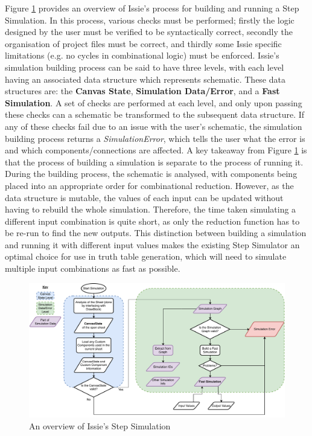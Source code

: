 Figure \ref{fig:flowchartSim} provides an overview of Issie's process for building and running a Step Simulation. In this process, various checks must be performed; firstly the logic designed by the user must be verified to be syntactically correct, secondly the organisation of project files must be correct, and thirdly some Issie specific limitations (e.g. no cycles in combinational logic) must be enforced. Issie's simulation building process can be said to have three levels, with each level having an associated data structure which represents schematic. These data structures are: the \textbf{Canvas State}, \textbf{Simulation Data/Error}, and a \textbf{Fast Simulation}. A set of checks are performed at each level, and only upon passing these checks can a schematic be transformed to the subsequent data structure.
If any of these checks fail due to an issue with the user's schematic, the simulation building process returns a \textit{SimulationError}, which tells the user what the error is and which components/connections are affected. A key takeaway from Figure \ref{fig:flowchartSim} is that the process of building a simulation is separate to the process of running it. During the  building process, the schematic is analysed, with components being placed into an appropriate order for combinational reduction. However, as the  data structure is mutable, the values of each input can be updated without having to rebuild the whole simulation. Therefore, the time taken simulating a different input combination is quite short, as only the reduction function has to be re-run to find the new outputs. 
This distinction between building a simulation and running it with different input values makes the existing Step Simulator an optimal choice for use in truth table generation, which will need to simulate multiple input combinations as fast as possible. 

\begin{figure}[h]
    \centering
    \includegraphics[width=\textwidth]{04.AnalysisDesign/IssieSim.pdf}
    \caption{An overview of Issie's Step Simulation}
    \label{fig:flowchartSim}
\end{figure}

